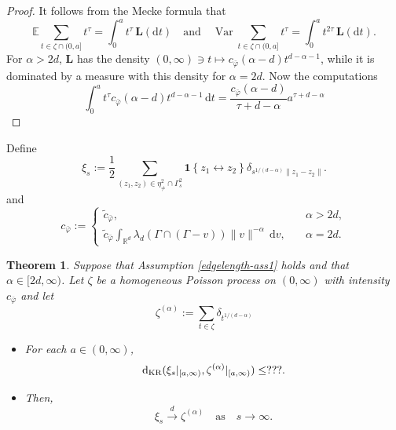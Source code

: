 \documentclass{article}
\newtheorem{theorem}{Theorem}[section]
\theoremstyle{definition}
\numberwithin{equation}{section}
\theoremstyle{remark}
\begin{document}
\begin{proof}
It follows from the Mecke formula that
$$
\mathbb{E}\sum_{t\in\zeta\cap(0,a]} t^\tau = \int_0^a t^\tau \, \mathbf{L}(\mathrm{d}t) \quad \text{and} \quad \operatorname{Var}\sum_{t\in\zeta\cap(0,a]} t^\tau = \int_0^a t^{2\tau} \, \mathbf{L}(\mathrm{d}t).
$$
For $\alpha>2d$, $\mathbf{L}$ has the density $(0,\infty)\ni t\mapsto c_{\bar{\varphi}} (\alpha-d) t^{d-\alpha-1}$, while it is dominated by a measure with this density for $\alpha=2d$. Now the computations
$$
\int_0^a t^\tau c_{\bar{\varphi}} (\alpha-d) t^{d-\alpha-1} \, \mathrm{d}t = \frac{c_{\bar{\varphi}} (\alpha-d)}{\tau+d-\alpha} a^{\tau+d-\alpha}
$$
\end{proof}
\fi

\iffalse
Define
$$
\xi_s:=\frac{1}{2}\sum_{(z_1,z_2)\in\eta^2_{\neq}\cap \Gamma_s^2} \mathbf{1}\left\{ z_1 \leftrightarrow z_2 \right\}\delta_{s^{1/(d-\alpha)}\|z_1-z_2\|}.
$$
and 
$$
c_{\bar{\varphi}} := \begin{cases} \tilde{c}_{\bar{\varphi}}, & \quad \alpha>2d, \\
\tilde{c}_{\bar{\varphi}} \int_{\mathbb{R}^d} \lambda_d(\Gamma\cap(\Gamma -v)) \|v\|^{-\alpha} \, \mathrm{d}v , & \quad \alpha=2d.\end{cases}
$$

\begin{theorem}\label{thm:edge-length_process2}
Suppose that Assumption \ref{edgelength-ass1} holds and that $\alpha\in[2d,\infty)$. Let $\zeta$ be a homogeneous Poisson process on $(0,\infty)$ with intensity $c_{\bar{\varphi}}$ and let
$$
\zeta^{(\alpha)}:= \sum_{t\in\zeta} \delta_{t^{1/(d-\alpha)}}
$$
\begin{itemize}
\item [a)] For each $a\in(0,\infty)$,
$$
{\rm d_{KR}}(\xi_s|_{[a,\infty)}, \zeta^{(\alpha)}|_{[a,\infty)}) \leq ???.
$$
\item [b)] Then,
$$
\xi_s \overset{d}{\longrightarrow} \zeta^{(\alpha)} \quad \text{as} \quad s\to\infty.
$$
\end{itemize}
\end{theorem}
\end{document}
